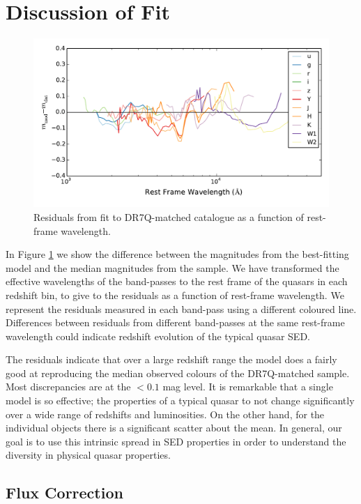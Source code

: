 \section{Discussion of Fit}

\begin{figure}
  \centering
  \includegraphics[width=\textwidth]{figures/chapter06/residuals_nocorr}
  \caption{Residuals from fit to DR7Q-matched catalogue as a function of rest-frame wavelength.}
  \label{fig:residuals}
\end{figure}

In Figure \ref{fig:residuals} we show the difference between the magnitudes from the best-fitting model and the median magnitudes from the sample. 
We have transformed the effective wavelengths of the band-passes to the rest frame of the quasars in each redshift bin, to give to the residuals as a function of rest-frame wavelength. 
We represent the residuals measured in each band-pass using a different coloured line. 
Differences between residuals from different band-passes at the same rest-frame wavelength could indicate redshift evolution of the typical quasar SED. 

The residuals indicate that over a large redshift range the model does a fairly good at reproducing the median observed colours of the DR7Q-matched sample. 
Most discrepancies are at the $<0.1$ mag level. 
It is remarkable that a single model is so effective; the properties of a typical quasar to not change significantly over a wide range of redshifts and luminosities. 
On the other hand, for the individual objects there is a significant scatter about the mean. 
In general, our goal is to use this intrinsic spread in SED properties in order to understand the diversity in physical quasar properties. 

\subsection{Flux Correction}

